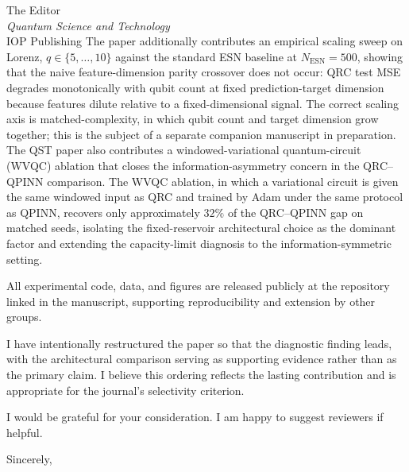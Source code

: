 \documentclass[11pt,a4paper]{letter}
\begin{document}
\begin{letter}{
  The Editor \\
  \textit{Quantum Science and Technology} \\
  IOP Publishing
}
The paper additionally contributes an empirical scaling sweep on
Lorenz, $q \in \{5, \dots, 10\}$ against the standard ESN baseline at
$N_{\mathrm{ESN}} = 500$, showing that the naive feature-dimension
parity crossover does not occur: QRC test MSE degrades monotonically
with qubit count at fixed prediction-target dimension because features
dilute relative to a fixed-dimensional signal. The correct scaling
axis is matched-complexity, in which qubit count and target dimension
grow together; this is the subject of a separate companion manuscript
in preparation. The QST paper also contributes a windowed-variational
quantum-circuit (WVQC) ablation that closes the information-asymmetry
concern in the QRC--QPINN comparison. The WVQC
ablation, in which a variational circuit is given the same windowed
input as QRC and trained by Adam under the same protocol as QPINN,
recovers only approximately $32\%$ of the QRC--QPINN gap on matched
seeds, isolating the fixed-reservoir architectural choice as the
dominant factor and extending the capacity-limit diagnosis to the
information-symmetric setting.

All experimental code, data, and figures are released publicly at the
repository linked in the manuscript, supporting reproducibility and
extension by other groups.

I have intentionally restructured the paper so that the diagnostic
finding leads, with the architectural comparison serving as
supporting evidence rather than as the primary claim. I believe this
ordering reflects the lasting contribution and is appropriate for
the journal's selectivity criterion.

I would be grateful for your consideration. I am happy to suggest
reviewers if helpful.

\closing{Sincerely,}

\end{letter}
\end{document}
